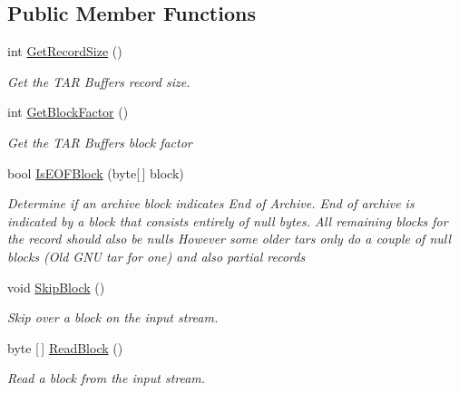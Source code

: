 \subsection*{Public Member Functions}
\begin{DoxyCompactItemize}
\item 
int \hyperlink{class_i_c_sharp_code_1_1_sharp_zip_lib_1_1_tar_1_1_tar_buffer_a9c0ea4d0e06ee2b30734790969900ab6}{Get\+Record\+Size} ()
\begin{DoxyCompactList}\small\item\em Get the T\+AR Buffer\textquotesingle{}s record size. \end{DoxyCompactList}\item 
int \hyperlink{class_i_c_sharp_code_1_1_sharp_zip_lib_1_1_tar_1_1_tar_buffer_ad6a7ea52f703433c37da286520e6f3e0}{Get\+Block\+Factor} ()
\begin{DoxyCompactList}\small\item\em Get the T\+AR Buffer\textquotesingle{}s block factor \end{DoxyCompactList}\item 
bool \hyperlink{class_i_c_sharp_code_1_1_sharp_zip_lib_1_1_tar_1_1_tar_buffer_a2f86e0c8b79e23b9e93a4332f59170e1}{Is\+E\+O\+F\+Block} (byte\mbox{[}$\,$\mbox{]} block)
\begin{DoxyCompactList}\small\item\em Determine if an archive block indicates End of Archive. End of archive is indicated by a block that consists entirely of null bytes. All remaining blocks for the record should also be null\textquotesingle{}s However some older tars only do a couple of null blocks (Old G\+NU tar for one) and also partial records \end{DoxyCompactList}\item 
void \hyperlink{class_i_c_sharp_code_1_1_sharp_zip_lib_1_1_tar_1_1_tar_buffer_ab6bab34e56056d8ee5890246edb56e8c}{Skip\+Block} ()
\begin{DoxyCompactList}\small\item\em Skip over a block on the input stream. \end{DoxyCompactList}\item 
byte \mbox{[}$\,$\mbox{]} \hyperlink{class_i_c_sharp_code_1_1_sharp_zip_lib_1_1_tar_1_1_tar_buffer_a401cc4e6bb1efe7f710101ee1032586e}{Read\+Block} ()
\begin{DoxyCompactList}\small\item\em Read a block from the input stream. \end{DoxyCompactList}\item 

\end{DoxyCompactItemize}
